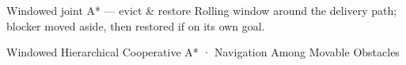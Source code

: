 \begin{frame}{Windowed joint A* — evict \& restore}
    {Rolling window around the delivery path; blocker moved aside, then restored if on its own goal.}

  \vspace{-0.1cm}
  \begin{center}
    \footnotesize\textcolor{muted}{Windowed Hierarchical Cooperative A* ·
      Navigation Among Movable Obstacles}
  \end{center}
\end{frame}
